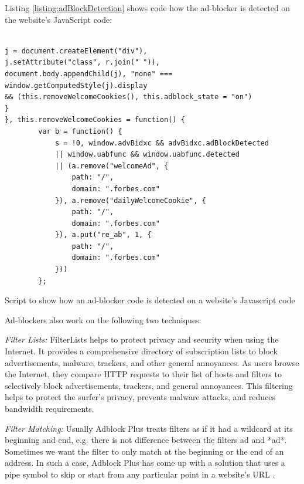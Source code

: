 \documentclass[runningheads,a4paper]{llncs}
\begin{document}
Listing \ref{listing:adBlockDetection} shows code how the ad-blocker is detected on the website's JavaScript code:
\begin{listing}[!h]
\begin{verbatim}
               
j = document.createElement("div"),
j.setAttribute("class", r.join(" ")), 
document.body.appendChild(j), "none" === window.getComputedStyle(j).display 
&& (this.removeWelcomeCookies(), this.adblock_state = "on")
}
}, this.removeWelcomeCookies = function() {
        var b = function() {
            s = !0, window.advBidxc && advBidxc.adBlockDetected 
            || window.uabfunc && window.uabfunc.detected 
            || (a.remove("welcomeAd", {
                path: "/",
                domain: ".forbes.com"
            }), a.remove("dailyWelcomeCookie", {
                path: "/",
                domain: ".forbes.com"
            }), a.put("re_ab", 1, {
                path: "/",
                domain: ".forbes.com"
            }))
        };
\end{verbatim}
\caption{Script to show how an ad-blocker code is detected on a website's Javascript code}
\label{listing:adBlockDetection}
\end{listing}
Ad-blockers also work on the following two techniques:

\textit{Filter Lists:} FilterLists \cite{filterLists} helps to protect privacy and security when using the Internet. It provides a comprehensive directory of subscription lists to block advertisements, malware, trackers, and other general annoyances. As users browse the Internet, they compare HTTP requests to their list of hosts and filters to selectively block advertisements, trackers, and general annoyances. This filtering helps to protect the surfer’s privacy, prevents malware attacks, and reduces bandwidth requirements.

\textit{Filter Matching:} Usually Adblock Plus treats filters as if it had a wildcard at its beginning and end, e.g. there is not difference between the filters ad and *ad*. Sometimes we want the filter to only match at the beginning or the end of an address. In such a case, Adblock Plus has come up with a solution that uses a pipe symbol to skip or start from any particular point in a website's URL \cite{filterMatching}.
\end{document}
